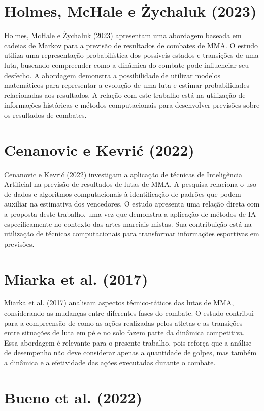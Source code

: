 \documentclass[12pt,a4paper]{report}
\begin{document}
\section{Holmes, McHale e Żychaluk (2023)}

Holmes, McHale e Żychaluk (2023) apresentam uma abordagem baseada em cadeias de Markov para a previsão de resultados de combates de MMA. O estudo utiliza uma representação probabilística dos possíveis estados e transições de uma luta, buscando compreender como a dinâmica do combate pode influenciar seu desfecho. A abordagem demonstra a possibilidade de utilizar modelos matemáticos para representar a evolução de uma luta e estimar probabilidades relacionadas aos resultados. A relação com este trabalho está na utilização de informações históricas e métodos computacionais para desenvolver previsões sobre os resultados de combates.

\section{Cenanovic e Kevrić (2022)}

Cenanovic e Kevrić (2022) investigam a aplicação de técnicas de Inteligência Artificial na previsão de resultados de lutas de MMA. A pesquisa relaciona o uso de dados e algoritmos computacionais à identificação de padrões que podem auxiliar na estimativa dos vencedores. O estudo apresenta uma relação direta com a proposta deste trabalho, uma vez que demonstra a aplicação de métodos de IA especificamente no contexto das artes marciais mistas. Sua contribuição está na utilização de técnicas computacionais para transformar informações esportivas em previsões.

\section{Miarka et al. (2017)}

Miarka et al. (2017) analisam aspectos técnico-táticos das lutas de MMA, considerando as mudanças entre diferentes fases do combate. O estudo contribui para a compreensão de como as ações realizadas pelos atletas e as transições entre situações de luta em pé e no solo fazem parte da dinâmica competitiva. Essa abordagem é relevante para o presente trabalho, pois reforça que a análise de desempenho não deve considerar apenas a quantidade de golpes, mas também a dinâmica e a efetividade das ações executadas durante o combate.

\section{Bueno et al. (2022)}
\end{document}
